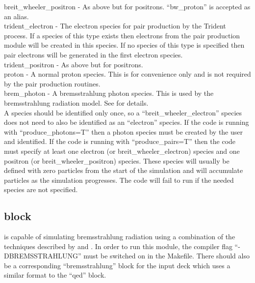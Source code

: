 {\emphtext breit\_wheeler\_positron} - As above but for positrons.
  ``bw\_proton'' is accepted as an alias.\\

{\emphtext trident\_electron} - The electron species for pair production by
  the Trident process. If a species of this type exists then electrons from
  the pair production module will be created in this species. If no species
  of this type is specified then pair electrons will be generated in the first
  electron species.\\

{\emphtext trident\_positron} - As above but for positrons.\\

{\emphtext proton} - A normal proton species. This is for convenience only and
  is not required by the pair production routines.\\

{\emphtext brem\_photon} - A bremsstrahlung photon species. This is used by the
  bremsstrahlung radiation model. See  for details.\\

A species should be identified only once, so a ``breit\_wheeler\_electron''
species does not need to also be identified as an ``electron'' species. If the
code is running with ``produce\_photons=T'' then a photon species must be
created by the user and identified. If the code is running with
``produce\_pairs=T'' then the code must specify at least one electron (or
breit\_wheeler\_electron) species and one positron (or breit\_wheeler\_positron)
species. These species will usually be defined with zero particles from the
start of the simulation and will accumulate particles as the simulation
progresses. The code will fail to run if the needed species are not specified.

\subsection{\texorpdfstring
  { block}
  {           {bremsstrahlung} block}}
\label{sec:bremsstrahlung_block}

{\EPOCH} is capable of simulating bremsstrahlung radiation using a combination
of the techniques described by \citet{Vyskocil2018} and \citet{Wu2018}. In
order to run this module, the compiler flag ``-DBREMSSTRAHLUNG'' must be
switched on in the Makefile. There should also be a corresponding
``bremsstrahlung'' block for the input deck which uses a similar
 format to the ``qed'' block.

